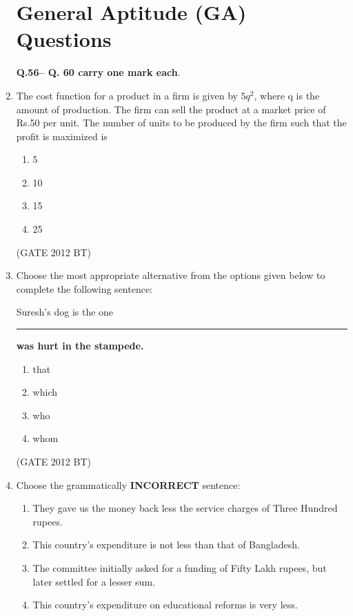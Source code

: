 \documentclass[journal,12pt,onecolumn]{IEEEtran}
\theoremstyle{remark}
\begin{document}
\begin{enumerate}
\section{General Aptitude (GA) Questions}
\textbf{Q.56– Q. 60 carry one mark each}.
\item 	The cost function for a product in a firm is given by $5q^{2}$, where q is the amount of production. The firm can sell the product at a market price of Rs.50 per unit. The number of units to be produced by the firm such that the profit is maximized is
\begin{multicols}{4}
\begin{enumerate}
\item  5	
\item  10	
\item  15
\item  25
\end{enumerate}
\end{multicols} \hfill(GATE 2012 BT)


\item Choose the most appropriate alternative from the options given below to complete the following sentence:

Suresh’s dog is the one\rule{2cm}{0.4pt} \textbf{was hurt in the stampede.}
\begin{multicols}{4}
\begin{enumerate}
\item  that	
\item  which
\item  who
\item  whom
\end{enumerate}
\end{multicols} \hfill(GATE 2012 BT)


\item Choose the grammatically\textbf{ INCORRECT} sentence:

\begin{enumerate}
\item	They gave us the money back less the service charges of Three Hundred rupees.
\item 	This country’s expenditure is not less than that of Bangladesh.
\item 	The committee initially asked for a funding of Fifty Lakh rupees, but later settled for a lesser sum.
\item 	This country’s expenditure on educational reforms is very less.
\end{enumerate}


\end{enumerate}
\end{document}
